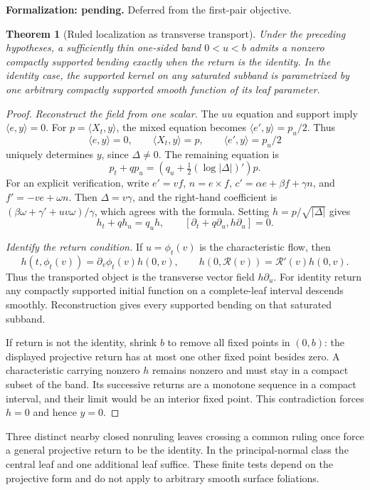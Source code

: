 \documentclass[11pt]{amsart}
\newtheorem{theorem}{Theorem}[section]
\theoremstyle{definition}
\theoremstyle{remark}
\numberwithin{equation}{section}
\begin{document}
\par\noindent\textbf{Formalization: pending.} Deferred from the first-pair objective.\par
\begin{theorem}[Ruled localization as transverse transport]
\label{thm:general-ruled-kernel}
Under the preceding hypotheses, a sufficiently thin one-sided band
$0<u<b$ admits a nonzero compactly supported bending exactly when the
return is the identity. In the identity case, the supported kernel on
any saturated subband is parametrized by one arbitrary compactly supported
smooth function of its leaf parameter.
\end{theorem}
\begin{proof}
\emph{Reconstruct the field from one scalar.}
The $uu$ equation and support imply $\langle e,y\rangle=0$.
For $p=\langle X_t,y\rangle$, the mixed equation becomes
$\langle e',y\rangle=p_u/2$. Thus
\begin{equation}\label{eq:general-bending-reconstruction}
 \langle e,y\rangle=0,\qquad \langle X_t,y\rangle=p,
 \qquad\langle e',y\rangle=p_u/2
\end{equation}
uniquely determines $y$, since $\Delta\ne0$. The remaining equation is
\[
 p_t+qp_u=\left(q_u+\tfrac12(\log|\Delta|)'\right)p.
\]
For an explicit verification, write $e'=vf$, $n=e\times f$,
$c'=\alpha e+\beta f+\gamma n$, and $f'=-ve+\omega n$.
Then $\Delta=v\gamma$, and the right-hand coefficient is
$(\beta\omega+\gamma'+uv\omega)/\gamma$, which agrees with the formula.
Setting $h=p/\sqrt{|\Delta|}$ gives
\begin{equation}\label{eq:transverse-vector-transport}
 h_t+qh_u=q_uh,
 \qquad[\partial_t+q\partial_u,h\partial_u]=0.
\end{equation}

\emph{Identify the return condition.}
If $u=\phi_t(v)$ is the characteristic flow, then
\[
 h(t,\phi_t(v))=\partial_v\phi_t(v)h(0,v),\qquad
 h(0,\mathcal R(v))=\mathcal R'(v)h(0,v).
\]
Thus the transported object is the transverse vector field $h\partial_u$.
For identity return any compactly supported initial function on a
complete-leaf interval descends smoothly. Reconstruction gives every
supported bending on that saturated subband.

If return is not the identity, shrink $b$ to remove all fixed points in
$(0,b)$: the displayed projective return has at most one other fixed
point besides zero. A characteristic carrying nonzero $h$ remains nonzero
and must stay in a compact subset of the band. Its successive returns
are a monotone sequence in a compact interval, and their limit would be
an interior fixed point. This contradiction forces $h=0$ and hence $y=0$.
\end{proof}
Three distinct nearby closed nonruling leaves crossing a common ruling
once force a general projective return to be the identity. In the
principal-normal class the central leaf and one additional leaf suffice.
These finite tests depend on the projective form and do not apply to
arbitrary smooth surface foliations.
\end{document}
